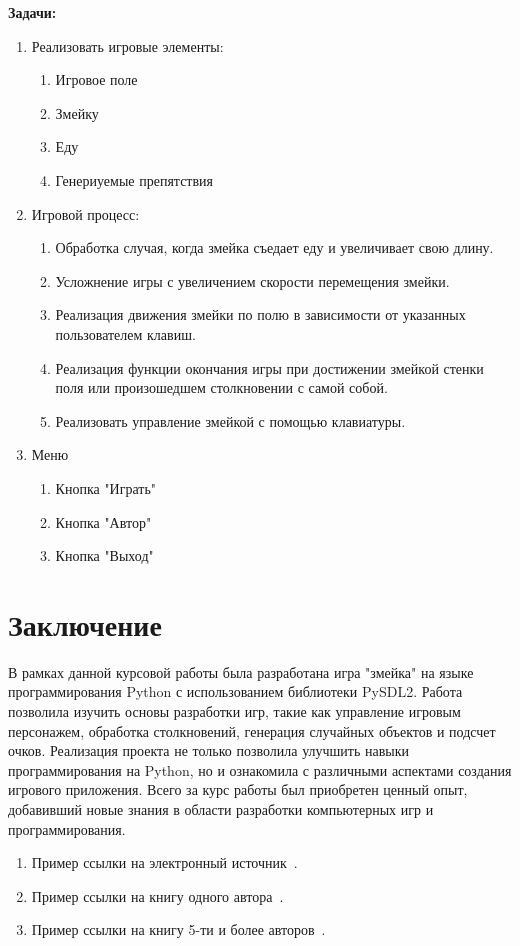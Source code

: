 \documentclass[14pt, oneside]{altsu-report}
\begin{document}
\textbf{Задачи:}
\begin{enumerate}
\item Реализовать игровые элементы:
\begin{enumerate}
\item Игровое поле
\item Змейку
\item Еду
\item Генериуемые препятствия
\end{enumerate}
\item Игровой процесс:
\begin{enumerate}
\item Обработка случая, когда змейка съедает еду и увеличивает свою длину.
\item Усложнение игры с увеличением скорости перемещения змейки.
\item Реализация движения змейки по полю в зависимости от указанных пользователем клавиш.
\item Реализация функции окончания игры при достижении змейкой стенки поля или произошедшем столкновении с самой собой.
\item Реализовать управление змейкой с помощью клавиатуры.
\end{enumerate}
\item Меню
\begin{enumerate}
\item Кнопка "Играть"
\item Кнопка "Автор"
\item Кнопка "Выход"
\end{enumerate}
\end{enumerate}





\chapter*{Заключение}
В рамках данной курсовой работы была разработана игра "змейка" на языке программирования Python с использованием библиотеки PySDL2. Работа позволила изучить основы разработки игр, такие как управление игровым персонажем, обработка столкновений, генерация случайных объектов и подсчет очков. Реализация проекта не только позволила улучшить навыки программирования на Python, но и ознакомила с различными аспектами создания игрового приложения. Всего за курс работы был приобретен ценный опыт, добавивший новые знания в области разработки компьютерных игр и программирования.
\begin{enumerate}
\item Пример ссылки на электронный источник~\cite{wikiRUBitbucket,wikiRUIdSoftware,wikiRUGitHub}.
\item Пример ссылки на книгу одного автора~\cite{book1author}.
\item Пример ссылки на книгу 5-ти и более авторов~\cite{book5author}.
\end{enumerate}
\end{document}

